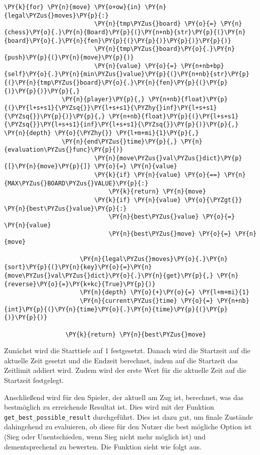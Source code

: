 \begin{Verbatim}[commandchars=\\\{\}]
                     \PY{k}{for} \PY{n}{move} \PY{o+ow}{in} \PY{n}{legal\PYZus{}moves}\PY{p}{:}
                         \PY{n}{tmp\PYZus{}board} \PY{o}{=} \PY{n}{chess}\PY{o}{.}\PY{n}{Board}\PY{p}{(}\PY{n+nb}{str}\PY{p}{(}\PY{n}{board}\PY{o}{.}\PY{n}{fen}\PY{p}{(}\PY{p}{)}\PY{p}{)}\PY{p}{)}
                         \PY{n}{tmp\PYZus{}board}\PY{o}{.}\PY{n}{push}\PY{p}{(}\PY{n}{move}\PY{p}{)}
                         \PY{n}{value} \PY{o}{=} \PY{n+nb+bp}{self}\PY{o}{.}\PY{n}{min\PYZus{}value}\PY{p}{(}\PY{n+nb}{str}\PY{p}{(}\PY{n}{tmp\PYZus{}board}\PY{o}{.}\PY{n}{fen}\PY{p}{(}\PY{p}{)}\PY{p}{)}\PY{p}{,} 
				\PY{n}{player}\PY{p}{,} \PY{n+nb}{float}\PY{p}{(}\PY{l+s+s1}{\PYZsq{}}\PY{l+s+s1}{\PYZhy{}inf}\PY{l+s+s1}{\PYZsq{}}\PY{p}{)}\PY{p}{,} \PY{n+nb}{float}\PY{p}{(}\PY{l+s+s1}{\PYZsq{}}\PY{l+s+s1}{inf}\PY{l+s+s1}{\PYZsq{}}\PY{p}{)}\PY{p}{,} \PY{n}{depth} \PY{o}{\PYZhy{}} \PY{l+m+mi}{1}\PY{p}{,} 
				\PY{n}{end\PYZus{}time}\PY{p}{,} \PY{n}{evaluation\PYZus{}func}\PY{p}{)}
                         \PY{n}{move\PYZus{}val\PYZus{}dict}\PY{p}{[}\PY{n}{move}\PY{p}{]} \PY{o}{=} \PY{n}{value}
                         \PY{k}{if} \PY{n}{value} \PY{o}{==} \PY{n}{MAX\PYZus{}BOARD\PYZus{}VALUE}\PY{p}{:}
                             \PY{k}{return} \PY{n}{move}
                         \PY{k}{if} \PY{n}{value} \PY{o}{\PYZgt{}} \PY{n}{best\PYZus{}value}\PY{p}{:}
                             \PY{n}{best\PYZus{}value} \PY{o}{=} \PY{n}{value}
                             \PY{n}{best\PYZus{}move} \PY{o}{=} \PY{n}{move}
                     
                     \PY{n}{legal\PYZus{}moves}\PY{o}{.}\PY{n}{sort}\PY{p}{(}\PY{n}{key}\PY{o}{=}\PY{n}{move\PYZus{}val\PYZus{}dict}\PY{o}{.}\PY{n}{get}\PY{p}{,} \PY{n}{reverse}\PY{o}{=}\PY{k+kc}{True}\PY{p}{)}
                     \PY{n}{depth} \PY{o}{+}\PY{o}{=} \PY{l+m+mi}{1}
                     \PY{n}{current\PYZus{}time} \PY{o}{=} \PY{n+nb}{int}\PY{p}{(}\PY{n}{time}\PY{o}{.}\PY{n}{time}\PY{p}{(}\PY{p}{)}\PY{p}{)}
                     
                 \PY{k}{return} \PY{n}{best\PYZus{}move}
\end{Verbatim}

    Zunächst wird die Starttiefe auf 1 festgesetzt. Danach wird die
Startzeit auf die aktuelle Zeit gesetzt und die Endzeit berechnet, indem
auf die Startzeit das Zeitlimit addiert wird. Zudem wird der erste Wert
für die aktuelle Zeit auf die Startzeit festgelegt.

Anschließend wird für den Spieler, der aktuell am Zug ist, berechnet,
was das bestmöglich zu erreichende Resultat ist. Dies wird mit der
Funktion \texttt{get\_best\_possible\_result} durchgeführt. Dies ist
dazu gut, um finale Zustände dahingehend zu evaluieren, ob diese für den
Nutzer die best mögliche Option ist (Sieg oder Unentschieden, wenn Sieg
nicht mehr möglich ist) und dementsprechend zu bewerten. Die Funktion
sieht wie folgt aus.

